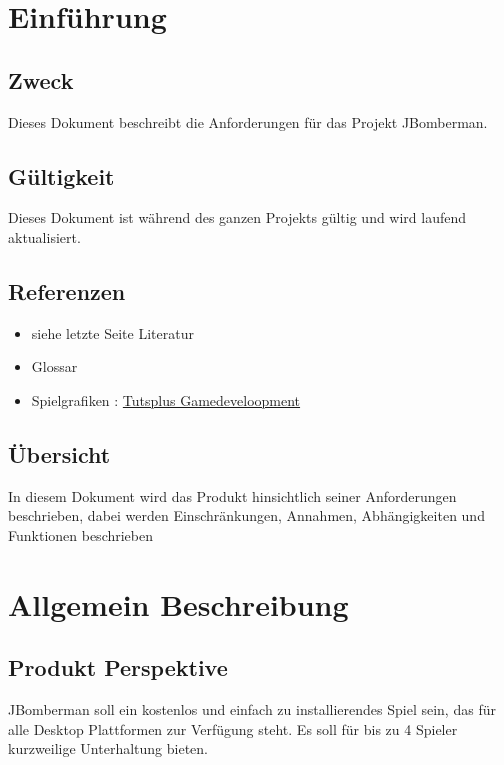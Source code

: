 \documentclass[11pt]{scrartcl}
\begin{document}
\newpage
\tableofcontents
\newpage
\section{Einführung}
\label{sec:Einführung}
\subsection{Zweck}
\label{sec:Zweck}
Dieses Dokument beschreibt die Anforderungen für das Projekt JBomberman.
\subsection{Gültigkeit}
\label{sec:Gültigkeit}
Dieses Dokument ist während des ganzen Projekts gültig und wird laufend aktualisiert.
\subsection{Referenzen}
\label{sec:Referenzen}
\begin{itemize}
  \item siehe letzte Seite Literatur
  \item Glossar
  \item Spielgrafiken : \href{http://gamedevelopment.tutsplus.com/articles/enjoy-
these-totally-free-bomberman-inspired-sprites--gamedev-8541}
{Tutsplus Gamedeveloopment}
\end{itemize}


\subsection{Übersicht}
\label{sec:Übersicht}
In diesem Dokument wird das Produkt hinsichtlich seiner Anforderungen 
beschrieben, dabei werden Einschränkungen, Annahmen, 
Abhängigkeiten und Funktionen beschrieben

\section{Allgemein Beschreibung}
\label{sec:Allgemeine Beschreibung}

\subsection{Produkt Perspektive}
\label{sec:Produkt Perspektive}
JBomberman soll ein kostenlos und einfach zu installierendes Spiel sein, 
das für alle Desktop Plattformen zur Verfügung steht.
Es soll für bis zu 4 Spieler kurzweilige Unterhaltung bieten.
\end{document}
